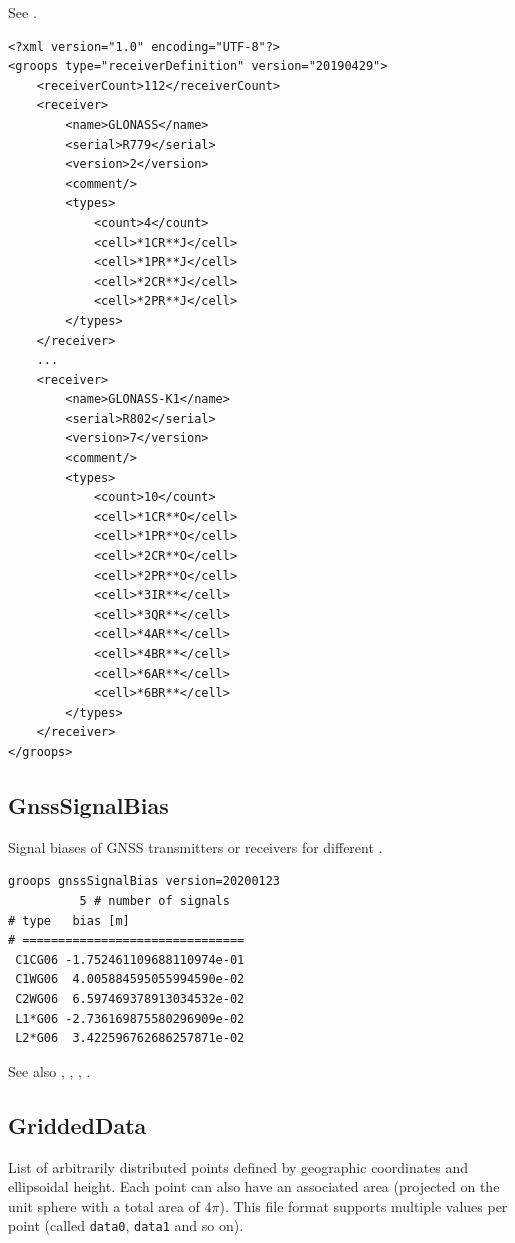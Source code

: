 See .

\begin{verbatim}
<?xml version="1.0" encoding="UTF-8"?>
<groops type="receiverDefinition" version="20190429">
    <receiverCount>112</receiverCount>
    <receiver>
        <name>GLONASS</name>
        <serial>R779</serial>
        <version>2</version>
        <comment/>
        <types>
            <count>4</count>
            <cell>*1CR**J</cell>
            <cell>*1PR**J</cell>
            <cell>*2CR**J</cell>
            <cell>*2PR**J</cell>
        </types>
    </receiver>
    ...
    <receiver>
        <name>GLONASS-K1</name>
        <serial>R802</serial>
        <version>7</version>
        <comment/>
        <types>
            <count>10</count>
            <cell>*1CR**O</cell>
            <cell>*1PR**O</cell>
            <cell>*2CR**O</cell>
            <cell>*2PR**O</cell>
            <cell>*3IR**</cell>
            <cell>*3QR**</cell>
            <cell>*4AR**</cell>
            <cell>*4BR**</cell>
            <cell>*6AR**</cell>
            <cell>*6BR**</cell>
        </types>
    </receiver>
</groops>
\end{verbatim}


\subsection{GnssSignalBias}\label{general.fileFormat:gnssSignalBias}
Signal biases of GNSS transmitters or receivers for different .

\begin{verbatim}
groops gnssSignalBias version=20200123
          5 # number of signals
# type   bias [m]
# ===============================
 C1CG06 -1.752461109688110974e-01
 C1WG06  4.005884595055994590e-02
 C2WG06  6.597469378913034532e-02
 L1*G06 -2.736169875580296909e-02
 L2*G06  3.422596762686257871e-02
 \end{verbatim}

See also , , , .


\subsection{GriddedData}\label{general.fileFormat:griddedData}
List of arbitrarily distributed points defined by geographic coordinates and ellipsoidal
height. Each point can also have an associated area
(projected on the unit sphere with a total area of $4\pi$).
This file format supports multiple values per point (called \verb|data0|, \verb|data1| and so on).

